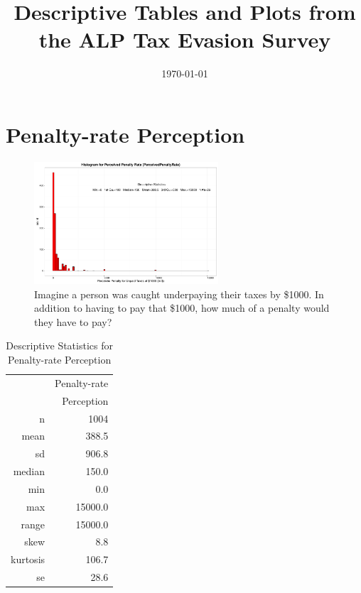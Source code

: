 \documentclass{NSF_proposal_mod}
\begin{document}
\title{Descriptive Tables and Plots from the ALP Tax Evasion Survey}
\date{\today}
\author{ }
\maketitle
{}

\section{Penalty-rate Perception}

\begin{figure}[h!]
\centering
\includegraphics[width = 0.61\textwidth]{HistPerceivedPenaltyRate.pdf}
\caption{Imagine a person was caught underpaying their taxes by \$1000. In addition to having to pay that \$1000, how much of a penalty would they have to pay?}
\label{Fig1}
\end{figure}


\begin{table}[ht]
\centering
\begin{tabular}{rr}
  \hline
 & Penalty-rate \\
&  Perception\\ 
  \hline
  n & 1004 \\ 
  mean & 388.5 \\ 
  sd & 906.8 \\ 
  median & 150.0 \\ 
  min & 0.0 \\ 
  max & 15000.0 \\ 
  range & 15000.0 \\ 
  skew & 8.8 \\ 
  kurtosis & 106.7 \\ 
  se & 28.6 \\ 
   \hline
\end{tabular}
\caption{Descriptive Statistics for Penalty-rate Perception} 
\end{table}
\end{document}
